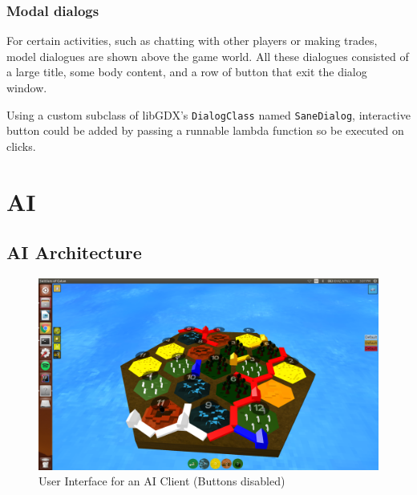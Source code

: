 \documentclass[a4paper,doc]{apa6}
\newcommand{\code}{\texttt}
\begin{document}
\subsubsection{Modal dialogs}

For certain activities, such as chatting with other players or making trades, model dialogues are shown above the game world. All these dialogues consisted of a large title, some body content, and a row of button that exit the dialog window.

Using a custom subclass of libGDX's \code{DialogClass} named \code{SaneDialog}, interactive button could be added by passing a runnable lambda function so be executed on clicks.

\section{AI}
\subsection{AI Architecture}
\begin{figure}[hbtp]
      \includegraphics[width=\textwidth]{userInterfaceAI}
      \caption{User Interface for an AI Client (Buttons disabled)}
\end{figure}
\end{document}
